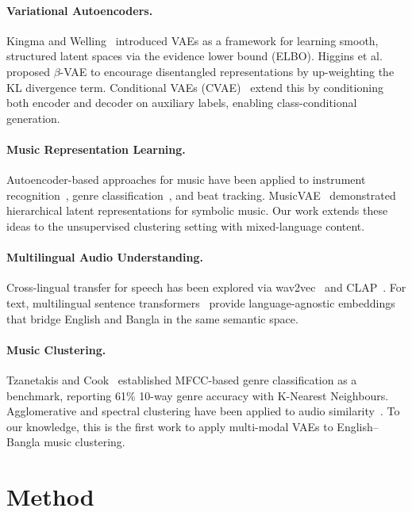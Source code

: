 \documentclass{article}
\begin{document}
\paragraph{Variational Autoencoders.} Kingma and Welling~\cite{kingma2013auto} introduced VAEs as a framework for learning smooth, structured latent spaces via the evidence lower bound (ELBO). Higgins et al.~\cite{higgins2017betavae} proposed $\beta$-VAE to encourage disentangled representations by up-weighting the KL divergence term. Conditional VAEs (CVAE)~\cite{sohn2015learning} extend this by conditioning both encoder and decoder on auxiliary labels, enabling class-conditional generation.

\paragraph{Music Representation Learning.} Autoencoder-based approaches for music have been applied to instrument recognition~\cite{choi2016automatic}, genre classification~\cite{dong2018convolutional}, and beat tracking. MusicVAE~\cite{roberts2018hierarchical} demonstrated hierarchical latent representations for symbolic music. Our work extends these ideas to the unsupervised clustering setting with mixed-language content.

\paragraph{Multilingual Audio Understanding.} Cross-lingual transfer for speech has been explored via wav2vec~\cite{baevski2020wav2vec} and CLAP~\cite{elizalde2022clap}. For text, multilingual sentence transformers~\cite{reimers2019sentence} provide language-agnostic embeddings that bridge English and Bangla in the same semantic space.

\paragraph{Music Clustering.} Tzanetakis and Cook~\cite{tzanetakis2002musical} established MFCC-based genre classification as a benchmark, reporting 61\% 10-way genre accuracy with K-Nearest Neighbours. Agglomerative and spectral clustering have been applied to audio similarity~\cite{levy2006music}. To our knowledge, this is the first work to apply multi-modal VAEs to English--Bangla music clustering.

\section{Method}
\end{document}

